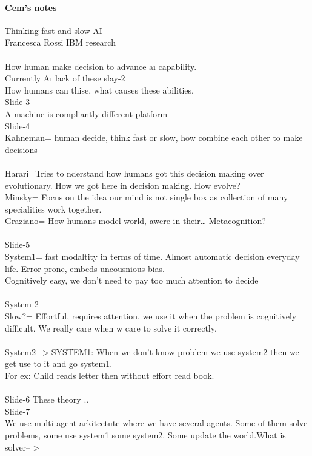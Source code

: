 \documentclass{article}
\begin{document}
\paragraph{Cem's notes}
Thinking fast and slow AI \\
Francesca Rossi IBM research \\
 \\
How human make decision to advance aı capability. \\
Currently Aı lack of these slay-2 \\
How humans can thise, what causes these abilities, \\
Slide-3 \\
A machine is compliantly different platform \\
Slide-4 \\
Kahneman= human decide, think fast or slow, how combine each other to make decisions \\
 \\
Harari=Tries to nderstand how humans got this decision making over evolutionary. How we got here in decision making. How evolve? \\
Minsky= Focus on the idea our mind is not single box as collection of many specialities work together. \\
Graziano= How humans model world, awere in their… Metacognition? \\
 \\
Slide-5 \\
System1= fast modaltity in terms of time. Almost automatic decision everyday life. Error prone, embeds uncousnious bias. \\
Cognitively easy, we don’t need to pay too much attention to decide \\
 \\
System-2 \\
Slow?= Effortful, requires attention, we use it when the problem is cognitively difficult. We really care when w care to solve it correctly. \\
 \\
System2--$>$SYSTEM1: When we don’t know problem we use system2 then we get use to  it and go system1. \\
For ex: Child reads letter then without effort read book. \\
 \\
Slide-6 These theory .. \\
Slide-7 \\
We use multi agent arkitectute where we have several agents. Some of them solve problems, some use system1 some system2. Some update the world.What is solver--$>$  \\
\end{document}
